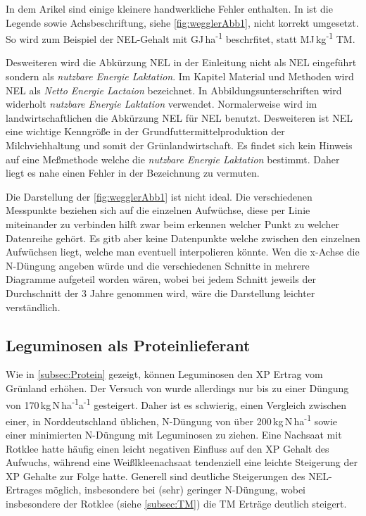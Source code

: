 In dem Arikel \parencite[33-36]{weggler2050leguminosen} sind einige kleinere handwerkliche Fehler enthalten.
In \textcite[35]{weggler2050leguminosen} ist die Legende sowie Achsbeschriftung, siehe \cref{fig:wegglerAbb1}, nicht korrekt umgesetzt.
So wird zum Beispiel der \ac{NEL}-Gehalt mit GJ\,ha\textsuperscript{-1} beschrfitet, statt MJ\,kg\textsuperscript{-1} \ac{TM}.

Desweiteren wird die Abkürzung \ac{NEL} in der Einleitung nicht als \acl{NEL} eingeführt sondern als \textit{nutzbare Energie Laktation}.
Im Kapitel Material und Methoden wird \ac{NEL} als \textit{Netto Energie Lactaion} bezeichnet.
In Abbildungsunterschriften wird widerholt \textit{nutzbare Energie Laktation} verwendet.
Normalerweise wird im landwirtschaftlichen die Abkürzung \acs{NEL} für \acl{NEL} benutzt.
Desweiteren ist \ac{NEL} eine wichtige Kenngröße in der Grundfuttermittelproduktion der Milchviehhaltung und somit der Grünlandwirtschaft.
Es findet sich kein Hinweis auf eine Meßmethode welche die \textit{nutzbare Energie Laktation} bestimmt.
Daher liegt es nahe einen Fehler in der Bezeichnung zu vermuten.

Die Darstellung der \cref{fig:wegglerAbb1} ist nicht ideal.
Die verschiedenen Messpunkte beziehen sich auf die einzelnen Aufwüchse, diese per Linie miteinander zu verbinden hilft zwar beim erkennen welcher Punkt zu welcher Datenreihe gehört.
Es gitb aber keine Datenpunkte welche zwischen den einzelnen Aufwüchsen liegt, welche man eventuell interpolieren könnte.
Wen die x-Achse die N-Düngung angeben würde und die verschiedenen Schnitte in mehrere Diagramme aufgeteil worden wären, wobei bei jedem Schnitt jeweils der Durchschnitt der 3 Jahre genommen wird, wäre die Darstellung leichter verständlich.


\subsection{Leguminosen als Proteinlieferant}
\label{sub:leguminosen}
Wie in \cref{subsec:Protein} gezeigt, können Leguminosen den \ac{XP} Ertrag vom Grünland erhöhen.
Der Versuch von \textcite[33-36]{weggler2050leguminosen} wurde allerdings nur bis zu einer Düngung von 170\,kg\,N\,ha\textsuperscript{-1}a\textsuperscript{-1} gesteigert.
Daher ist es schwierig, einen Vergleich zwischen einer, in Norddeutschland üblichen, N-Düngung von über 200\,kg\,N\,ha\textsuperscript{-1} sowie einer minimierten N-Düngung mit Leguminosen zu ziehen.
Eine Nachsaat mit Rotklee hatte häufig einen leicht negativen Einfluss auf den \ac{XP} Gehalt des Aufwuchs, während eine Weißlkleenachsaat tendenziell eine leichte Steigerung der \ac{XP} Gehalte zur Folge hatte.
Generell sind deutliche Steigerungen des \ac{NEL}-Ertrages möglich, insbesondere bei (sehr) geringer N-Düngung, wobei insbesondere der Rotklee (siehe \cref{subsec:TM}) die \ac{TM} Erträge deutlich steigert.

